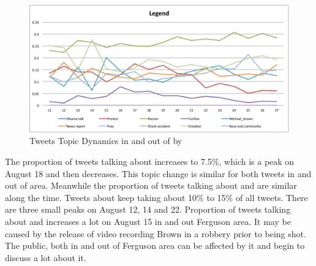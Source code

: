\begin{figure}[htpb]
\centering
{}
\includegraphics[width=\linewidth]{figures/Legend.pdf}
\caption{Tweets Topic Dynamics in and out of \stlouis by \stlda}\label{fig:tweets_topics_stlouis}
\end{figure}

The proportion of tweets talking about \curfew increases to 7.5\%, which is a peak on August 18 and then decreases. This topic change is similar for both tweets in and out of \stlouis area. Meanwhile the proportion of tweets talking about \newsreport and \michaelbrown are similar along the time. Tweets about \newsreport keep taking about 10\% to 15\% of all tweets. There are three small peaks on August 12, 14 and 22. Proportion of tweets talking about \michaelbrown and \shootincident increases a lot on August 15 in and out Ferguson area. It may be caused by the release of video recording Brown in a robbery prior to being shot. The public, both in and out of Ferguson area can be affected by it and begin to discuss a lot about it.

